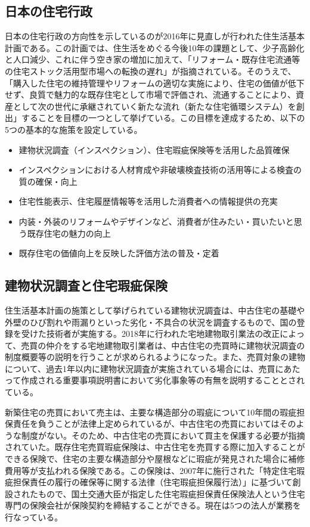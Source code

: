 \documentclass[a4paper,fontsize=11pt,report,notitlepage,line_length=38zw,number_of_lines=40,dvipdfmx]{jlreq}
\begin{document}
\subsection{日本の住宅行政}
日本の住宅行政の方向性を示しているのが2016年に見直しが行われた住生活基本計画である\cite{juseikatsu}。この計画では、住生活をめぐる今後10年の課題として、少子高齢化と人口減少、これに伴う空き家の増加に加えて、「リフォーム・既存住宅流通等の住宅ストック活用型市場への転換の遅れ」が指摘されている。そのうえで、「購入した住宅の維持管理やリフォームの適切な実施により、住宅の価値が低下せず、良質で魅力的な既存住宅として市場で評価され、流通することにより、資産として次の世代に承継されていく新たな流れ（新たな住宅循環システム）を創出」することを目標の一つとして挙げている。この目標を達成するため、以下の5つの基本的な施策を設定している。
\begin{itemize}
\item 建物状況調査（インスペクション）、住宅瑕疵保険等を活用した品質確保
\item インスペクションにおける人材育成や非破壊検査技術の活用等による検査の質の確保・向上
\item 住宅性能表示、住宅履歴情報等を活用した消費者への情報提供の充実
\item 内装・外装のリフォームやデザインなど、消費者が住みたい・買いたいと思う既存住宅の魅力の向上
\item 既存住宅の価値向上を反映した評価方法の普及・定着
\end{itemize}

\subsection{建物状況調査と住宅瑕疵保険}
住生活基本計画の施策として挙げられている建物状況調査は、中古住宅の基礎や外壁のひび割れや雨漏りといった劣化・不具合の状況を調査するもので、国の登録を受けた技術者が実施する。2018年に行われた宅地建物取引業法の改正によって、売買の仲介をする宅地建物取引業者は、中古住宅の売買時に建物状況調査の制度概要等の説明を行うことが求められるようになった。また、売買対象の建物について、過去1年以内に建物状況調査が実施されている場合には、売買にあたって作成される重要事項説明書において劣化事象等の有無を説明することとされている\cite{takuchitatemono}。

新築住宅の売買において売主は、主要な構造部分の瑕疵について10年間の瑕疵担保責任を負うことが法律上定められているが、中古住宅の売買においてはそのような制度がない。そのため、中古住宅の売買において買主を保護する必要が指摘されていた。既存住宅売買瑕疵保険は、中古住宅を売買する際に加入することができる保険で、住宅の主要な構造部分や屋根などに瑕疵が発見された場合に補修費用等が支払われる保険である。この保険は、2007年に施行された「特定住宅瑕疵担保責任の履行の確保等に関する法律（住宅瑕疵担保履行法）」に基づいて創設されたもので、国土交通大臣が指定した住宅瑕疵担保責任保険法人という住宅専門の保険会社が保険契約を締結することができる。現在は5つの法人が業務を行なっている。
\end{document}
